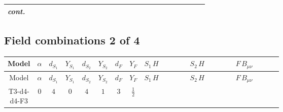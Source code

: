 \documentclass[8pt]{article}
\begin{document}
\begin{landscape}
\begin{longtable}{@{}cccccccc >{\raggedright\arraybackslash}p{0.21\linewidth} >{\raggedright\arraybackslash}p{0.21\linewidth} >{\raggedright\arraybackslash}p{0.21\linewidth}@{}}
\textit{cont.} &  &  &  &  &  &  &  & \scriptsize\adjustbox{max width=\linewidth}{$\begin{gathered} -\frac{8 \hbar  \log \left(\frac{\bar{\mu}^{2}}{m_2^2}\right) \overline{\lambda_5} H_{a_1} H_{a_2} m_2^2 \lambda_5 H_{a_1}{}^{\dagger } H_{a_2}{}^{\dagger }}{3 \left(m_1^2-m_2^2\right)}\end{gathered}$} &  &  \\
\midrule
\bottomrule
\end{longtable}
\clearpage
\subsection*{Field combinations 2 of 4}
\begin{longtable}{@{}cccccccc >{\raggedright\arraybackslash}p{0.21\linewidth} >{\raggedright\arraybackslash}p{0.21\linewidth} >{\raggedright\arraybackslash}p{0.21\linewidth}@{}}
\toprule
Model & $\alpha$ & $d_{S_1}$ & $Y_{S_1}$ & $d_{S_2}$ & $Y_{S_2}$ & $d_F$ & $Y_F$ & $S_1\,H$ & $S_2\,H$ & $F\,B_{\mu\nu}$ \\
\midrule
\endfirsthead
\toprule
Model & $\alpha$ & $d_{S_1}$ & $Y_{S_1}$ & $d_{S_2}$ & $Y_{S_2}$ & $d_F$ & $Y_F$ & $S_1\,H$ & $S_2\,H$ & $F\,B_{\mu\nu}$ \\
\midrule
\endhead
T3-d4-d4-F3 & $0$ & $4$ & $0$ & $4$ & $1$ & $3$ & $\frac{1}{2}$ & \scriptsize\adjustbox{max width=\linewidth}{$\begin{gathered} +\frac{3 \hbar  H_{a_1} H_{a_2} H_{a_1}{}^{\dagger } H_{a_2}{}^{\dagger } \left(\lambda_{HS_1}^{(1)}^{(1)}\right){}^2}{4 \epsilon } \\ +\frac{3}{4} \hbar  \log \left(\frac{\bar{\mu}^{2}}{m_1^2}\right) H_{a_1} H_{a_2} H_{a_1}{}^{\dagger } H_{a_2}{}^{\dagger } \left(\lambda_{HS_1}^{(1)}^{(1)}\right){}^2 \\ +\frac{23 \hbar  H_{a_1} H_{a_2} H_{a_1}{}^{\dagger } H_{a_2}{}^{\dagger } \left(\lambda_{HS_1}^{(1)}^{(2)}\right){}^2}{12 \epsilon }\end{gathered}$} & \scriptsize\adjustbox{max width=\linewidth}{$\begin{gathered} +\frac{3 \hbar  H_{a_1} H_{a_2} H_{a_1}{}^{\dagger } H_{a_2}{}^{\dagger } \left(\lambda_{HS_2}^{(1)}^{(1)}\right){}^2}{4 \epsilon } \\ +\frac{3}{4} \hbar  \log \left(\frac{\bar{\mu}^{2}}{m_2^2}\right) H_{a_1} H_{a_2} H_{a_1}{}^{\dagger } H_{a_2}{}^{\dagger } \left(\lambda_{HS_2}^{(1)}^{(1)}\right){}^2 \\ +\frac{23 \hbar  H_{a_1} H_{a_2} H_{a_1}{}^{\dagger } H_{a_2}{}^{\dagger } \left(\lambda_{HS_2}^{(1)}^{(2)}\right){}^2}{12 \epsilon }\end{gathered}$} & \scriptsize\adjustbox{max width=\linewidth}{$\begin{gathered} -\frac{3}{4} \hbar  \log \left(\frac{\bar{\mu}^{2}}{M_F^2}\right) B_{\mu _1\mu _2}^2\end{gathered}$} \\

\end{longtable}
\end{landscape}
\end{document}
